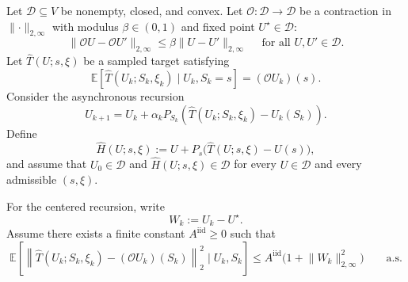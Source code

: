 \documentclass{article}
\begin{document}
Let $\mathcal D\subseteq V$ be nonempty, closed, and convex. Let $\mathcal O:\mathcal D\to\mathcal D$ be a contraction in $\lVert \cdot \rVert_{2,\infty}$ with modulus $\beta\in(0,1)$ and fixed point $U^\star\in\mathcal D$:
\begin{equation}
\lVert \mathcal O U-\mathcal O U'\rVert_{2,\infty} \le \beta \lVert U-U'\rVert_{2,\infty} \quad\text{ for all } U,U'\in \mathcal D.
\end{equation}
Let $\widehat T(U;s,\xi)$ be a sampled target satisfying
\begin{equation}
\mathbb E\left[ \widehat T(U_k;S_k,\xi_k) \mid U_k, S_k=s\right] = (\mathcal O U_k)(s).
\end{equation}
Consider the asynchronous recursion
\begin{equation}
U_{k+1} = U_k + \alpha_k P_{S_k}\left(\widehat T(U_k;S_k,\xi_k)-U_k(S_k)\right).
\end{equation}
Define
\begin{equation}
\widehat H(U;s,\xi):=U+P_s\bigl(\widehat T(U;s,\xi)-U(s)\bigr),
\end{equation}
and assume that $U_0\in\mathcal D$ and $\widehat H(U;s,\xi)\in\mathcal D$ for every $U\in\mathcal D$ and every admissible $(s,\xi)$.

For the centered recursion, write
\begin{equation}
W_k := U_k-U^\star.
\end{equation}
Assume there exists a finite constant $A^{\mathrm{iid}}\ge 0$ such that
\begin{equation}
\mathbb E\left[\left\lVert\widehat T(U_k;S_k,\xi_k)-(\mathcal O U_k)(S_k)\right\rVert_2^2\mid U_k, S_k\right] \le A^{\mathrm{iid}}\bigl(1+\lVert W_k \rVert_{2,\infty}^2\bigr) \qquad\text{a.s.}
\end{equation}
\end{document}

